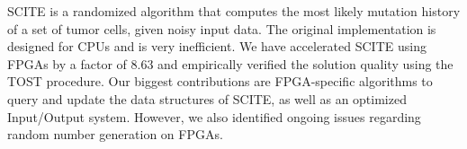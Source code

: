 \acs{SCITE} is a randomized algorithm that computes the most likely mutation history of a set of tumor cells, given noisy input data. The original implementation is designed for \acsp{CPU} and is very inefficient. We have accelerated \acs{SCITE} using \acp{FPGA} by a factor of 8.63 and empirically verified the solution quality using the \acl{TOST} procedure. Our biggest contributions are \ac{FPGA}-specific algorithms to query and update the data structures of \acs{SCITE}, as well as an optimized Input/Output system. However, we also identified ongoing issues regarding random number generation on \acp{FPGA}.